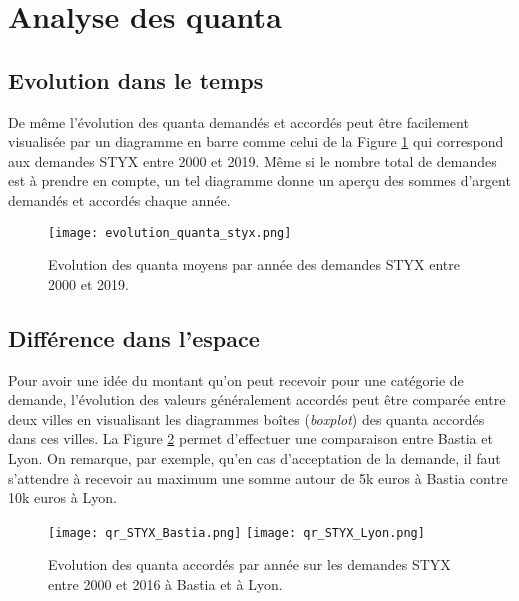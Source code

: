 \section{Analyse des quanta}
\subsection{Evolution dans le temps}
De même l'évolution des quanta demandés et accordés peut être facilement visualisée par un diagramme en barre comme celui de la Figure \ref{fig:demo:evolution-quanta-styx} qui correspond aux demandes STYX entre 2000  et 2019. Même si le nombre total de demandes est à prendre en compte, un tel diagramme donne un aperçu des sommes d'argent demandés et accordés chaque année. 

\begin{figure}[!htb]
	\centering 
	\texttt{[image: evolution\_quanta\_styx.png]}
	\caption{Evolution des quanta moyens par année des demandes STYX entre  2000  et 2019.}\label{fig:demo:evolution-quanta-styx}
\end{figure}


\subsection{Différence dans l'espace}

Pour avoir une idée du montant qu'on peut recevoir pour une catégorie de demande, l'évolution des valeurs généralement accordés peut être comparée entre deux villes en visualisant les diagrammes boîtes (\textit{boxplot}) 
des quanta accordés dans ces villes. La Figure \ref{fig:demo:evolution-qr-styx-compare-ville} permet d'effectuer une comparaison entre Bastia et Lyon. On remarque, par exemple, qu'en cas d'acceptation de la demande, il faut s'attendre à recevoir au maximum une somme autour de 5k euros à Bastia contre 10k euros à Lyon.

\begin{figure}[!htb]
	\centering 
	\texttt{[image: qr\_STYX\_Bastia.png]}
	\texttt{[image: qr\_STYX\_Lyon.png]}
	\caption{Evolution des quanta accordés par année sur les demandes STYX entre 2000 et 2016 à Bastia et à Lyon.}\label{fig:demo:evolution-qr-styx-compare-ville}
\end{figure}


